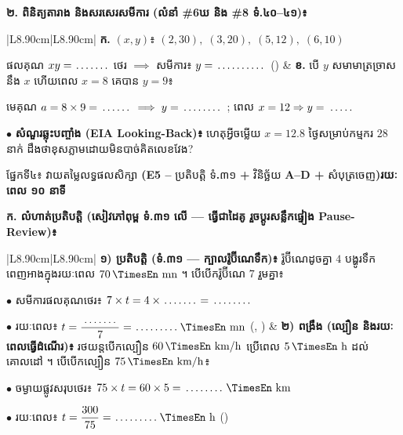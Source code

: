\documentclass[a4paper,10pt]{article}
\newcommand{\en}[1]{{\TimesEn #1}}
\newcommand{\enbf}[1]{{\TimesEn\bfseries #1}}
\newcommand{\unit}[1]{\,\text{\en{#1}}}
\newcommand{\cnum}[1]{\mbox{\fontsize{10pt}{12pt}\selectfont\ding{\numexpr181+#1\relax}}}
\newcommand{\blank}[1][1.5cm]{\makebox[#1]{\dotfill}}
\newcommand{\secbar}[2]{%
  \begin{tcolorbox}[enhanced, sharp corners, colback=headgray, colframe=black, boxrule=0.9pt, boxsep=1pt, top=2pt, bottom=2pt, left=5pt, right=5pt, before skip=4pt, after skip=3pt]
    {\muol\fontsize{9.2pt}{13pt}\selectfont #1}\hfill{\fontsize{8pt}{11pt}\selectfont\textbf{#2}}
  \end{tcolorbox}%
}
\begin{document}
\vspace{4pt}
\textbf{២. ពិនិត្យតារាង និងសរសេរសមីការ (លំនាំ \#6ឃ និង \#8 ទំ.៤០–៤១)៖}

{\renewcommand{\arraystretch}{1.44}
\begin{tabular}{|L{8.90cm}|L{8.90cm}|}
  \hline
  \textbf{ក.} $(x,y)$៖ $(2, 30),\; (3, 20),\; (5, 12),\; (6, 10)$\par\vspace{2pt}
  ផលគុណ $xy = \blank[1.1cm]$ ថេរ $\implies$ សមីការ៖ $y = \blank[1.6cm]$ (\cnum{1})
  &
  \textbf{ខ.} បើ $y$ សមាមាត្រច្រាសនឹង $x$ ហើយពេល $x = 8$ គេបាន $y = 9$៖\par\vspace{2pt}
  មេគុណ $a = 8\times 9 = \blank[1.0cm] \implies y = \blank[1.3cm]$ ; ពេល $x=12 \Rightarrow y=\blank[0.9cm]$ \\
  \hline
\end{tabular}}

\vspace{4pt}
$\bullet$ \textbf{សំណួរឆ្លុះបញ្ចាំង \en{(EIA Looking-Back)}៖} ហេតុអ្វីចម្លើយ $x = 12.8$ ថ្ងៃសម្រាប់កម្មករ $28$ នាក់ ដឹងថាខុសភ្លាមដោយមិនបាច់គិតលេខវែង? \blank[2.5cm]

\secbar{ផ្នែកទី៤៖ វាយតម្លៃលទ្ធផលសិក្សា \enbf{(E5 --} ប្រតិបត្តិ ទំ\enbf{.}៣១ \enbf{+} វិនិច្ឆ័យ \enbf{A--D +} សំបុត្រចេញ\enbf{)}}{រយៈពេល ១០ នាទី}

\textbf{ក. លំហាត់ប្រតិបត្តិ (សៀវភៅពុម្ព ទំ.៣១ លើ — ធ្វើជាដៃគូ រួចប្ដូរសន្លឹកផ្ទៀង \en{Pause-Review})៖}

{\renewcommand{\arraystretch}{1.48}
\begin{tabular}{|L{8.90cm}|L{8.90cm}|}
  \hline
  \textbf{១) ប្រតិបត្តិ (ទំ.៣១ — ក្បាលរ៉ូប៊ីណេទឹក)៖} រ៉ូប៊ីណេដូចគ្នា $4$ បង្ហូរទឹកពេញអាងក្នុងរយៈពេល $70\unit{mn}$ ។ បើបើករ៉ូប៊ីណេ $7$ រួមគ្នា៖\par\vspace{2pt}
  $\bullet$ សមីការផលគុណថេរ៖ $7 \times t = 4 \times \blank[1.1cm] = \blank[1.3cm]$\par\vspace{2pt}
  $\bullet$ រយៈពេល៖ $t = \dfrac{\blank[1.2cm]}{7} = \blank[1.4cm]\unit{mn}$ (\cnum{1}, \cnum{3})
  &
  \textbf{២) ពង្រឹង (ល្បឿន និងរយៈពេលធ្វើដំណើរ)៖} រថយន្តបើកល្បឿន $60\unit{km/h}$ ប្រើពេល $5\unit{h}$ ដល់គោលដៅ ។ បើបើកល្បឿន $75\unit{km/h}$៖\par\vspace{2pt}
  $\bullet$ ចម្ងាយផ្លូវសរុបថេរ៖ $75 \times t = 60 \times 5 = \blank[1.3cm]\unit{km}$\par\vspace{2pt}
  $\bullet$ រយៈពេល៖ $t = \dfrac{300}{75} = \blank[1.4cm]\unit{h}$ (\cnum{3}) \\
  \hline
\end{tabular}}
\end{document}
